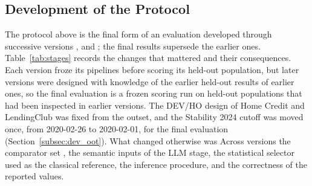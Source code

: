 \documentclass[final,5p,twocolumn]{elsarticle}
\providecommand{\DIFaddtex}[1]{{\protect\color{blue} \sf #1}} %
\providecommand{\DIFdeltex}[1]{{\protect\color{red} \scriptsize #1}} %
\providecommand{\DIFaddbegin}{} %
\providecommand{\DIFaddend}{} %
\providecommand{\DIFdelbegin}{} %
\providecommand{\DIFdelend}{} %
\providecommand{\DIFadd}[1]{\texorpdfstring{\DIFaddtex{#1}}{#1}} %
\providecommand{\DIFdel}[1]{\texorpdfstring{\DIFdeltex{#1}}{}} %
\begin{document}
\subsection{Development of the Protocol}
\label{subsec:protocol_development}

The protocol above is the final form of an evaluation developed through successive versions\DIFdelbegin \DIFdel{, and }\DIFdelend \DIFaddbegin \DIFadd{; }\DIFaddend the final results supersede the earlier ones. \DIFdelbegin \DIFdel{Table~\ref{tab:stages} records the changes that mattered and their consequences. }\DIFdelend Each version froze its pipelines before scoring its held-out population, but later versions were designed with knowledge of \DIFdelbegin \DIFdel{the }\DIFdelend \DIFaddbegin \DIFadd{earlier }\DIFaddend held-out results\DIFdelbegin \DIFdel{of earlier ones}\DIFdelend , so the final evaluation is a frozen scoring run on held-out populations \DIFdelbegin \DIFdel{that had been }\DIFdelend inspected in earlier versions. \DIFdelbegin \DIFdel{The DEV/HO design of Home Credit and LendingClub was fixed from the outset, and the Stability 2024 cutoff was moved once, from 2020-02-26 to 2020-02-01, for the final evaluation (Section~\ref{subsec:dev_oot}). What changed otherwise was }\DIFdelend \DIFaddbegin \DIFadd{Across versions }\DIFaddend the comparator set \DIFdelbegin \DIFdel{, the semantic inputs of the LLM stage, the statistical selector used as the classical reference, the inference procedure, and the correctness of the reported values.
}%
\end{document}
